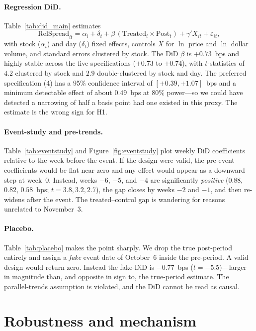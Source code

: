 \documentclass[12pt]{article}
\begin{document}
\paragraph{Regression DiD.} Table~\ref{tab:did_main} estimates
\[
\text{RelSpread}_{it}=\alpha_i+\delta_t+\beta\,(\text{Treated}_i\times\text{Post}_t)+\gamma' X_{it}+\varepsilon_{it},
\]
with stock ($\alpha_i$) and day ($\delta_t$) fixed effects, controls $X$ for $\ln$ price and
$\ln$ dollar volume, and standard errors clustered by stock. The DiD $\beta$ is
$+0.73$~bps and highly stable across the five specifications ($+0.73$ to $+0.74$), with
$t$-statistics of $4.2$ clustered by stock and $2.9$ double-clustered by stock and day. The
preferred specification (4) has a 95\% confidence interval of $[+0.39,+1.07]$~bps and a
minimum detectable effect of about $0.49$~bps at 80\% power---so we could have detected a
narrowing of half a basis point had one existed in this proxy. The estimate is the wrong
sign for H1.

\paragraph{Event-study and pre-trends.} Table~\ref{tab:eventstudy} and
Figure~\ref{fig:eventstudy} plot weekly DiD coefficients relative to the week before the
event. If the design were valid, the pre-event coefficients would be flat near zero and any
effect would appear as a downward step at week~0. Instead, weeks $-6$, $-5$, and $-4$ are
significantly \emph{positive} ($0.88$, $0.82$, $0.58$~bps; $t=3.8,3.2,2.7$), the gap closes
by weeks $-2$ and $-1$, and then re-widens after the event. The treated--control gap is
wandering for reasons unrelated to November~3.

\paragraph{Placebo.} Table~\ref{tab:placebo} makes the point sharply. We drop the true
post-period entirely and assign a \emph{fake} event date of October~6 inside the
pre-period. A valid design would return zero. Instead the fake-DiD is $-0.77$~bps
($t=-5.5$)---larger in magnitude than, and opposite in sign to, the true-period estimate.
The parallel-trends assumption is violated, and the DiD cannot be read as causal.

\section{Robustness and mechanism}\label{sec:rob}
\end{document}
